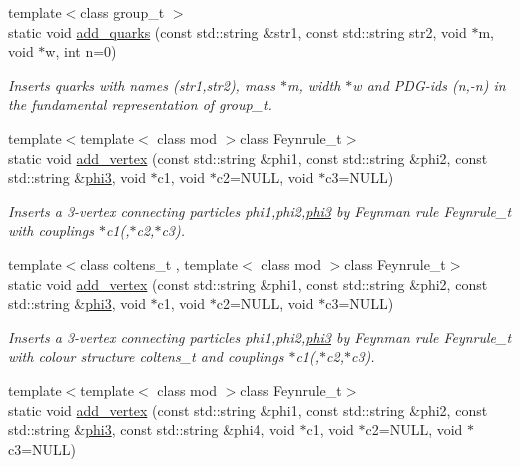 \begin{DoxyCompactItemize}
{\footnotesize template$<$class group\+\_\+t $>$ }\\static void \hyperlink{a00372_a3c1268dfedbc356a20a5fcd6febe8f3b}{add\+\_\+quarks} (const std\+::string \&str1, const std\+::string str2, void $\ast$m, void $\ast$w, int n=0)
\begin{DoxyCompactList}\small\item\em Inserts quarks with names (str1,str2), mass $\ast$m, width $\ast$w and P\+D\+G-\/ids (n,-\/n) in the fundamental representation of group\+\_\+t. \end{DoxyCompactList}\item 
{\footnotesize template$<$template$<$ class mod $>$class Feynrule\+\_\+t$>$ }\\static void \hyperlink{a00372_abd07d9b401653097ac2bd08865a17d2b}{add\+\_\+vertex} (const std\+::string \&phi1, const std\+::string \&phi2, const std\+::string \&\hyperlink{a00424}{phi3}, void $\ast$c1, void $\ast$c2=N\+U\+L\+L, void $\ast$c3=N\+U\+L\+L)
\begin{DoxyCompactList}\small\item\em Inserts a 3-\/vertex connecting particles phi1,phi2,\hyperlink{a00424}{phi3} by Feynman rule Feynrule\+\_\+t with couplings $\ast$c1(,$\ast$c2,$\ast$c3). \end{DoxyCompactList}\item 
\hypertarget{a00372_aeeca69f18dedd8c9855518cc895a3181}{}{\footnotesize template$<$class coltens\+\_\+t , template$<$ class mod $>$class Feynrule\+\_\+t$>$ }\\static void \hyperlink{a00372_aeeca69f18dedd8c9855518cc895a3181}{add\+\_\+vertex} (const std\+::string \&phi1, const std\+::string \&phi2, const std\+::string \&\hyperlink{a00424}{phi3}, void $\ast$c1, void $\ast$c2=N\+U\+L\+L, void $\ast$c3=N\+U\+L\+L)\label{a00372_aeeca69f18dedd8c9855518cc895a3181}

\begin{DoxyCompactList}\small\item\em Inserts a 3-\/vertex connecting particles phi1,phi2,\hyperlink{a00424}{phi3} by Feynman rule Feynrule\+\_\+t with colour structure coltens\+\_\+t and couplings $\ast$c1(,$\ast$c2,$\ast$c3). \end{DoxyCompactList}\item 
\hypertarget{a00372_ad944c2c9d2c051c4692285b4a6834a4c}{}{\footnotesize template$<$template$<$ class mod $>$class Feynrule\+\_\+t$>$ }\\static void \hyperlink{a00372_ad944c2c9d2c051c4692285b4a6834a4c}{add\+\_\+vertex} (const std\+::string \&phi1, const std\+::string \&phi2, const std\+::string \&\hyperlink{a00424}{phi3}, const std\+::string \&phi4, void $\ast$c1, void $\ast$c2=N\+U\+L\+L, void $\ast$c3=N\+U\+L\+L)\label{a00372_ad944c2c9d2c051c4692285b4a6834a4c}


\end{DoxyCompactItemize}
